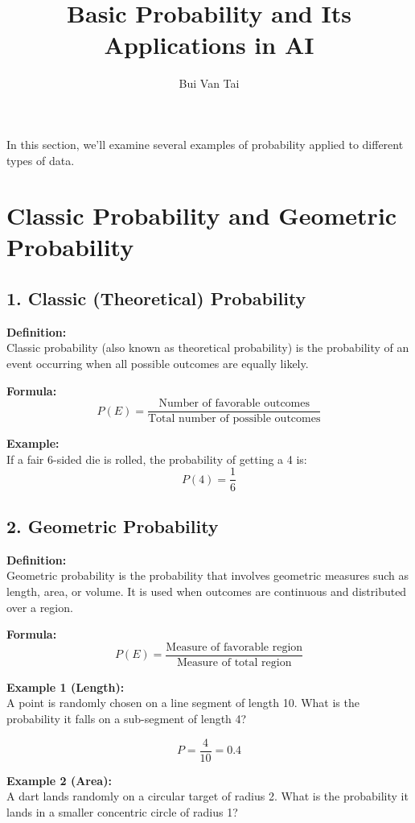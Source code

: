\documentclass{article}
\title{Basic Probability and Its Applications in AI}
\author{Bui Van Tai}
\date{}
\begin{document}
\maketitle
In this section, we'll examine several examples of probability applied to different types of data.
\section{Classic Probability and Geometric Probability}

\subsection*{1. Classic (Theoretical) Probability}

\textbf{Definition:} \\

Classic probability (also known as theoretical probability) is the probability of an event occurring when all possible outcomes are equally likely.

\bigskip

\textbf{Formula:}
\[
P(E) = \frac{\text{Number of favorable outcomes}}{\text{Total number of possible outcomes}}
\]

\textbf{Example:} \\
If a fair 6-sided die is rolled, the probability of getting a 4 is:
\[
P(4) = \frac{1}{6}
\]

\subsection*{2. Geometric Probability}

\textbf{Definition:} \\
Geometric probability is the probability that involves geometric measures such as length, area, or volume. It is used when outcomes are continuous and distributed over a region.

\bigskip

\textbf{Formula:}
\[
P(E) = \frac{\text{Measure of favorable region}}{\text{Measure of total region}}
\]

\textbf{Example 1 (Length):} \\
A point is randomly chosen on a line segment of length 10. What is the probability it falls on a sub-segment of length 4?

\[
P = \frac{4}{10} = 0.4
\]

\textbf{Example 2 (Area):} \\
A dart lands randomly on a circular target of radius 2. What is the probability it lands in a smaller concentric circle of radius 1?
\end{document}
